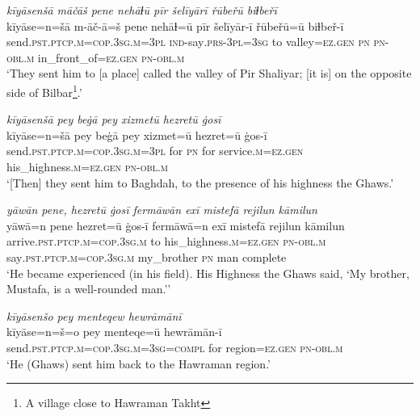 \ea \label{ZP.10}
\textit{kīyāsenšā māčāš pene nehāɫū pīr šelīyārī řūbeřū biɫbeřī} \\ 
\gll kīyāse=n=šā m-āč-ā=š pene nehāɫ=ū pīr šelīyār-ī řūbeřū=ū biɫbeř-ī \\ 
 send\textsc{.pst}\textsc{.ptcp}\textsc{.m}\textsc{=cop}\textsc{.3sg}\textsc{.m}\textsc{=3pl} \textsc{ind-}say\textsc{.prs}\textsc{-3pl}\textsc{=3sg} to valley\textsc{\textsc{=ez.gen}} \textsc{pn} \textsc{pn}\textsc{-obl}\textsc{.m} in\_front\_of\textsc{\textsc{=ez.gen}} \textsc{pn}\textsc{-obl}\textsc{.m} \\ 
\glt `They sent him to [a place] called the valley of Pir Shaliyar; [it is] on the opposite side of Bilbar\footnote{A village close to Hawraman Takht}.'
\z 
 
\ea \label{ZP.14}
\textit{kīyāsenšā pey beġā pey xizmetū hezretū ġosī} \\ 
\gll kīyāse=n=šā pey beġā pey xizmet=ū hezret=ū ġos-ī \\ 
 send\textsc{.pst}\textsc{.ptcp}\textsc{.m}\textsc{=cop}\textsc{.3sg}\textsc{.m}\textsc{=3pl} for \textsc{pn} for service\textsc{.m}\textsc{\textsc{=ez.gen}} his\_highness\textsc{.m}\textsc{\textsc{=ez.gen}} \textsc{pn}\textsc{-obl}\textsc{.m} \\ 
\glt `[Then] they sent him to Baghdah, to the presence of his highness the Ghaws.'
\z 
 
\ea \label{ZP.18}
\textit{yāwān pene, hezretū ġosī fermāwān exī mistefā rejilun kāmilun} \\ 
\gll yāwā=n pene hezret=ū ġos-ī fermāwā=n exī mistefā rejilun kāmilun \\ 
 arrive\textsc{.pst}\textsc{.ptcp}\textsc{.m}\textsc{=cop}\textsc{.3sg}\textsc{.m} to his\_highness\textsc{.m}\textsc{\textsc{=ez.gen}} \textsc{pn}\textsc{-obl}\textsc{.m} say\textsc{.pst}\textsc{.ptcp}\textsc{.m}\textsc{=cop}\textsc{.3sg}\textsc{.m} my\_brother \textsc{pn} man complete \\ 
\glt `He became experienced (in his field). His Highness the Ghaws said, ‘My brother, Mustafa, is a well-rounded man.’'
\z 
 
\ea \label{ZP.20}
\textit{kīyāsenšo pey menteqew hewrāmānī} \\ 
\gll kīyāse=n=š=o pey menteqe=ū hewrāmān-ī \\ 
 send\textsc{.pst}\textsc{.ptcp}\textsc{.m}\textsc{=cop}\textsc{.3sg}\textsc{.m}\textsc{=3sg}\textsc{=compl} for region\textsc{\textsc{=ez.gen}} \textsc{pn}\textsc{-obl}\textsc{.m} \\ 
\glt `He (Ghaws) sent him back to the Hawraman region.'
\z 
 
